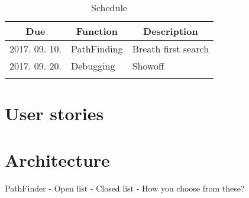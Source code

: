 \documentclass[11pt,oneside]{article}
\begin{document}
\begin{table}[H]
\centering
\caption{Schedule} \vspace{0.1cm}
\label{schedule}
\begin{tabular}{@{}lll@{}}
\toprule

\multicolumn{1}{c}{\textbf{Due}} &
\multicolumn{1}{c}{\textbf{Function}} &
\multicolumn{1}{c}{\textbf{Description}} \\

\midrule

\multicolumn{1}{|l|}{2017. 09. 10.} &
\multicolumn{1}{l|}{PathFinding} &
\multicolumn{1}{l|}{Breath first search} \\

\multicolumn{1}{|l|}{2017. 09. 20.} & 
\multicolumn{1}{l|}{Debugging} & 
\multicolumn{1}{l|}{Showoff} \\

&& \\

\bottomrule

\end{tabular}
\end{table}

\section{User stories}


\section{Architecture}


PathFinder
- Open list
- Closed list
- How you choose from these?
\end{document}

